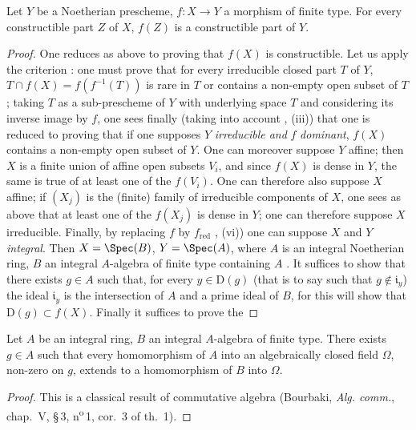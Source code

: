
\begin{corollary}[1.8.5]
\label{IV.1.8.5}
Let $Y$ be a Noetherian prescheme, $f:X\to Y$ a morphism of finite type.
For every constructible part $Z$ of $X$, $f(Z)$ is a constructible part of $Y$.
\end{corollary}

\begin{proof}
One reduces as above to proving that $f(X)$ is constructible.
Let us apply the criterion : one must prove that for every irreducible closed part $T$ of $Y$, $T\cap f(X)=f(f^{-1}(T))$ is rare in $T$ or contains a non-empty open subset of $T$; taking $T$ as a sub-prescheme of $Y$ with underlying space $T$  and considering its inverse image by $f$, one sees finally (taking into account , (iii)) that one is reduced to proving that if one supposes $Y$ \emph{irreducible and} $f$ \emph{dominant}, $f(X)$ contains a non-empty open subset of $Y$.
One can moreover suppose $Y$ affine; then $X$ is a finite union of affine open subsets $V_i$, and since $f(X)$ is dense in $Y$, the same is true of at least one of the $f(V_i)$.
One can therefore also suppose $X$ affine; if $(X_j)$ is the (finite) family of irreducible components of $X$, one sees as above that at least one of the $f(X_j)$ is dense in $Y$; one can therefore suppose $X$ irreducible.
Finally, by replacing $f$ by $f_{\mathrm{red}}$ , (vi)) one can suppose $X$ and $Y$ \emph{integral}.
Then $X=\Spec(B)$, $Y=\Spec(A)$, where $A$ is an integral Noetherian ring, $B$ an integral $A$-algebra of finite type containing $A$ .
It suffices to show that there exists $g\in A$ such that, for every $y\in\mathrm{D}(g)$ (that is to say such that $g\notin\mathfrak{i}_y$) the ideal $\mathfrak{i}_y$ is the intersection of $A$ and a prime ideal of $B$, for this will show that $\mathrm{D}(g)\subset f(X)$.
Finally it suffices to prove the
\end{proof}

\begin{lemma}[1.8.5.1]
\label{IV.1.8.5.1}
Let $A$ be an integral ring, $B$ an integral $A$-algebra of finite type.
There exists $g\in A$ such that every homomorphism of $A$ into an algebraically closed field $\Omega$, non-zero on $g$, extends to a homomorphism of $B$ into $\Omega$.
\end{lemma}

\begin{proof}
This is a classical result of commutative algebra (Bourbaki, \emph{Alg. comm.}, chap.~V, \S\,3, n\textsuperscript{o}\,1, cor.~3 of th.~1).
\end{proof}

